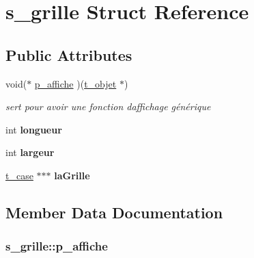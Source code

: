 \hypertarget{structs__grille}{}\section{s\+\_\+grille Struct Reference}
\label{structs__grille}
\subsection*{Public Attributes}
\begin{DoxyCompactItemize}
\item 
void($\ast$ \hyperlink{structs__grille_a6a1fee442f61163bd812944833997c24}{p\+\_\+affiche} )(\hyperlink{structs__objet}{t\+\_\+objet} $\ast$)
\begin{DoxyCompactList}\small\item\em sert pour avoir une fonction d\textquotesingle{}affichage générique \end{DoxyCompactList}\item 
int {\bfseries longueur}\hypertarget{structs__grille_a60eeaa595cc9a75ec7af7c0ac802acef}{}\label{structs__grille_a60eeaa595cc9a75ec7af7c0ac802acef}

\item 
int {\bfseries largeur}\hypertarget{structs__grille_a78f1afcc6704f3b5bd65554e16b7343e}{}\label{structs__grille_a78f1afcc6704f3b5bd65554e16b7343e}

\item 
\hyperlink{structs__case}{t\+\_\+case} $\ast$$\ast$$\ast$ {\bfseries la\+Grille}\hypertarget{structs__grille_aef2a67ac55b1d83a44fade47a6e63747}{}\label{structs__grille_aef2a67ac55b1d83a44fade47a6e63747}

\end{DoxyCompactItemize}


\subsection{Member Data Documentation}
\subsubsection[{\texorpdfstring{p\+\_\+affiche}{p_affiche}}]{\setlength{\rightskip}{0pt plus 5cm}s\+\_\+grille\+::p\+\_\+affiche}\hypertarget{structs__grille_a6a1fee442f61163bd812944833997c24}{}\label{structs__grille_a6a1fee442f61163bd812944833997c24}


